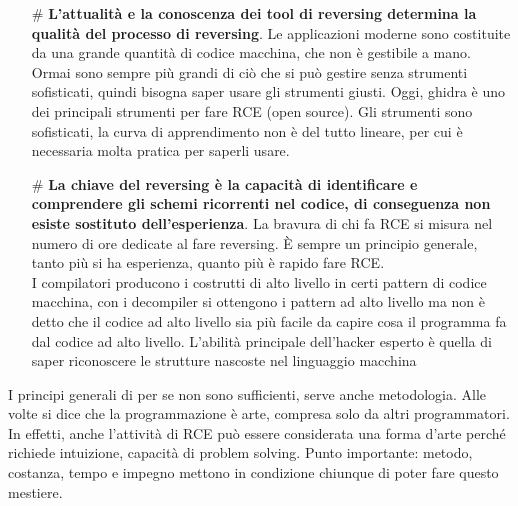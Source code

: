 \documentclass{article}
\begin{document}
\begin{itemize}
\item[\#] \textbf{L'attualità e la conoscenza dei tool di reversing determina la qualità del processo di reversing}. Le applicazioni moderne sono costituite da una grande quantità di codice macchina, che non è gestibile a mano. Ormai sono sempre più grandi di ciò che si può gestire senza strumenti sofisticati, quindi bisogna saper usare gli strumenti giusti. Oggi, ghidra è uno dei principali strumenti per fare RCE (open source). Gli strumenti sono sofisticati, la curva di apprendimento non è del tutto lineare, per cui è necessaria molta pratica per saperli usare.
\item[\#] \textbf{La chiave del reversing è la capacità di identificare e comprendere gli schemi ricorrenti nel codice, di conseguenza non esiste sostituto dell'esperienza}. La bravura di chi fa RCE si misura nel numero di ore dedicate al fare reversing. È sempre un principio generale, tanto più si ha esperienza, quanto più è rapido fare RCE.\\ I compilatori producono i costrutti di alto livello in certi pattern di codice macchina, con i decompiler si ottengono i pattern ad alto livello ma non è detto che il codice ad alto livello sia più facile da capire cosa il programma fa dal codice ad alto livello. L'abilità principale dell'hacker esperto è quella di saper riconoscere le strutture nascoste nel linguaggio macchina
\end{itemize} 
I principi generali di per se non sono sufficienti, serve anche metodologia. Alle volte si dice che la programmazione è arte, compresa solo da altri programmatori. In effetti, anche l'attività di RCE può essere considerata una forma d'arte perché richiede intuizione, capacità di problem solving. Punto importante: metodo, costanza, tempo e impegno mettono in condizione chiunque di poter fare questo mestiere.
\end{document}
